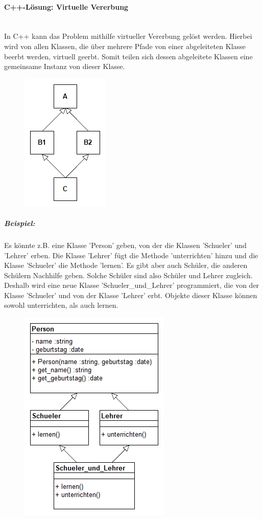 			\paragraph{C++-Lösung: Virtuelle Vererbung}\mbox{}\\
				In C++ kann das Problem mithilfe virtueller Vererbung gelöst werden. Hierbei wird von allen Klassen, die über
				mehrere Pfade von einer abgeleiteten Klasse beerbt werden, virtuell geerbt. Somit teilen sich dessen
				abgeleitete Klassen eine gemeinsame Instanz von dieser Klasse.
				\begin{figure}[H]
					\includegraphics[scale=0.75]{vererbung/mehrfach/diamond/virtuell.png}
				\end{figure}
				
				\subparagraph*{Beispiel:}
					Es könnte z.B. eine Klasse 'Person' geben, von der die Klassen 'Schueler' und 'Lehrer' erben. Die Klasse
					'Lehrer' fügt die Methode 'unterrichten' hinzu und die Klasse 'Schueler' die Methode 'lernen'. Es gibt aber
					auch Schüler, die anderen Schülern Nachhilfe geben. Solche Schüler sind also Schüler und Lehrer zugleich.
					Deshalb wird eine neue Klasse 'Schueler\_und\_Lehrer' programmiert, die von der Klasse 'Schueler' und von
					der Klasse 'Lehrer' erbt. Objekte dieser Klasse können sowohl unterrichten, als auch lernen.
					\begin{figure}[H]
						\includegraphics[scale=0.75]{vererbung/mehrfach/diamond/beispiele/schueler_lehrer/schueler_lehrer.png}
					\end{figure}
					
